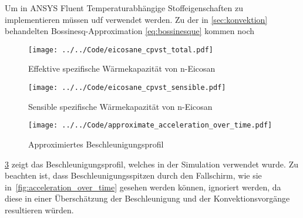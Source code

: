 Um in ANSYS Fluent Temperaturabhängige Stoffeigenschaften zu implementieren müssen \ac{udf} verwendet werden.
Zu der in \ref{sec:konvektion} behandelten Bossinesq-Approximation \ref{eq:bossinesque} kommen noch 

\begin{figure}[H]
  \centering
  \texttt{[image: ../../Code/eicosane\_cpvst\_total.pdf]}
  \caption{Effektive spezifische Wärmekapazität von n-Eicosan}\label{fig:pcm_effective_cp}
\end{figure}

\begin{figure}[H]
  \centering
  \texttt{[image: ../../Code/eicosane\_cpvst\_sensible.pdf]}
  \caption{Sensible spezifische Wärmekapazität von n-Eicosan}\label{fig:pcm_sensible_cp}
\end{figure}

\begin{figure}[H]
  \centering
  \texttt{[image: ../../Code/approximate\_acceleration\_over\_time.pdf]}
  \caption{Approximiertes Beschleunigungsprofil}\label{fig:approximierte_beschleunigung}
\end{figure}

\ref{fig:approximierte_beschleunigung} zeigt das Beschleunigungsprofil, welches in der Simulation verwendet wurde. Zu beachten
ist, dass Beschleunigungsspitzen durch den Fallschirm, wie sie in~\ref{fig:acceleration_over_time} gesehen
werden können, ignoriert werden, da diese in einer Überschätzung der Beschleunigung und der Konvektionsvorgänge resultieren würden.


